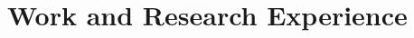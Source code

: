 \documentclass[10pt, letterpaper]{article}
\newenvironment{highlights}{
    \begin{itemize}[
        topsep=0.10 cm,
        parsep=0.10 cm,
        partopsep=0pt,
        itemsep=0pt,
        leftmargin=0.2 cm + 10pt
    ]
}{
    \end{itemize}
} %
\newenvironment{twocolentry}[2][]{
    \onecolentry
    \def\secondColumn{#2}
    \setcolumnwidth{\fill, 2.8 cm}
    \begin{paracol}{2}
}{
    \switchcolumn \raggedleft \secondColumn
    \end{paracol}
    \endonecolentry
} %
\begin{document}
 





\vspace{-1em}

\vspace{-.7em}
   
    \section{Work and Research Experience}
\end{document}
